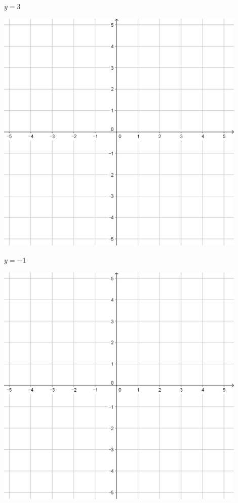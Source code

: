 \documentclass[a4paper]{oblivoir}
\begin{document}
\clearpage
\begin{minipage}{0.45\textwidth}\centering
\(y=3\)
\par\bigskip\includegraphics[width=0.9\textwidth]{55}
\end{minipage}
\begin{minipage}{0.45\textwidth}\centering
\(y=-1\)
\par\bigskip\includegraphics[width=0.9\textwidth]{55}
\end{minipage}\bigskip\bigskip\par
\end{document}
